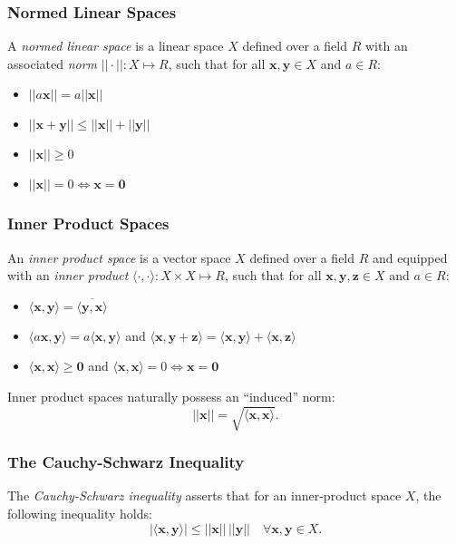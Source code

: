\subsubsection*{Normed Linear Spaces} A \textit{normed linear space} is a linear space $X$ defined over a field $R$ with an associated \textit{norm} $|| \cdot || \colon X \mapsto R$, such that for all $\mathbf{x}, \mathbf{y} \in X$ and $a \in R$:
\begin{itemize}
  \item $|| a \mathbf{x} || = a || \mathbf{x} ||$
  \item $|| \mathbf{x} + \mathbf{y} || \leq || \mathbf{x} || + || \mathbf{y} ||$
  \item $|| \mathbf{x} || \geq 0$
  \item $|| \mathbf{x} || = 0 \Leftrightarrow \mathbf{x} = \mathbf{0}$
\end{itemize}

\subsubsection*{Inner Product Spaces} An \textit{inner product space} is a vector space $X$ defined over a field $R$ and equipped with an \textit{inner product} $\langle \cdot, \cdot \rangle \colon X \times X \mapsto R$, such that for all $\mathbf{x}, \mathbf{y}, \mathbf{z} \in X$ and $a \in R$:
\begin{itemize}
  \item $\langle \mathbf{x}, \mathbf{y} \rangle = \overline{\langle \mathbf{y}, \mathbf{x} \rangle}$
  \item $\langle a\mathbf{x}, \mathbf{y} \rangle = a \langle \mathbf{x}, \mathbf{y} \rangle$ and $\langle \mathbf{x}, \mathbf{y} + \mathbf{z} \rangle = \langle \mathbf{x}, \mathbf{y} \rangle + \langle \mathbf{x}, \mathbf{z} \rangle$
  \item $\langle \mathbf{x}, \mathbf{x} \rangle \geq \mathbf{0}$ and $\langle \mathbf{x}, \mathbf{x} \rangle = 0 \Leftrightarrow \mathbf{x} = \mathbf{0}$
\end{itemize}
Inner product spaces naturally possess an ``induced'' norm:
\begin{equation}
  || \mathbf{x} || = \sqrt{\langle \mathbf{x}, \mathbf{x} \rangle}.
\end{equation}

\subsubsection*{The Cauchy-Schwarz Inequality} The \textit{Cauchy-Schwarz inequality} asserts that for an inner-product space $X$, the following inequality holds:
\begin{equation}
  | \langle \mathbf{x}, \mathbf{y} \rangle | \leq || \mathbf{x} || \, || \mathbf{y} || \quad \forall \mathbf{x}, \mathbf{y} \in X.
\end{equation}

